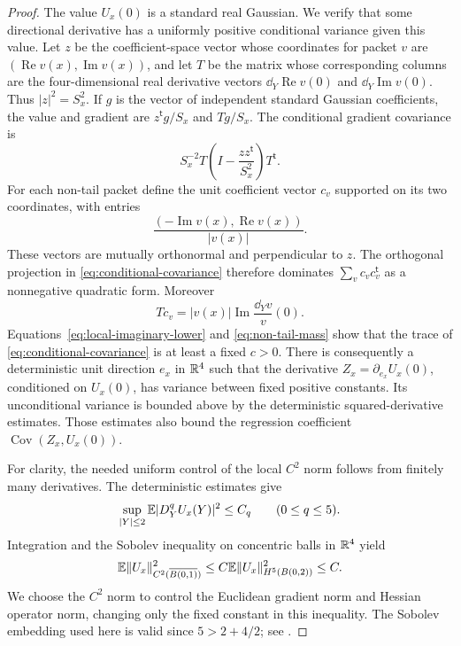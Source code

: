 \begin{proof}
The value $U_x(0)$ is a standard real Gaussian. We verify that some
directional derivative has a uniformly positive conditional
variance given this value. Let $z$ be the coefficient-space vector
whose coordinates for packet $v$ are
$(\operatorname{Re}v(x),\operatorname{Im}v(x))$, and let $T$ be the
matrix whose corresponding columns are the four-dimensional real
derivative vectors $\dd_Y\operatorname{Re}v(0)$ and
$\dd_Y\operatorname{Im}v(0)$. Thus $|z|^2=S_x^2$. If $g$ is the
vector of independent standard Gaussian coefficients, the value and
gradient are $z^{\mathsf t}g/S_x$ and $Tg/S_x$. The conditional
gradient covariance is
\begin{equation}\label{eq:conditional-covariance}
 S_x^{-2}T\left(I-\frac{zz^{\mathsf t}}{S_x^2}\right)T^{\mathsf t}.
\end{equation}
For each non-tail packet define the unit coefficient vector $c_v$
supported on its two coordinates, with entries
\[
 \frac{(-\operatorname{Im}v(x),\operatorname{Re}v(x))}{|v(x)|}.
\]
These vectors are mutually orthonormal and perpendicular to $z$.
The orthogonal projection in \eqref{eq:conditional-covariance}
therefore dominates $\sum_v c_vc_v^{\mathsf t}$ as a nonnegative
quadratic form. Moreover
\[
 Tc_v=|v(x)|\operatorname{Im}\frac{\dd_Yv}{v}(0).
\]
Equations~\eqref{eq:local-imaginary-lower} and
\eqref{eq:non-tail-mass} show that the trace of
\eqref{eq:conditional-covariance} is at least a fixed $c>0$.
There is consequently a deterministic unit direction $e_x$ in
$\mathbb R^4$ such that the derivative
$Z_x=\partial_{e_x}U_x(0)$, conditioned on $U_x(0)$, has variance
between fixed positive constants. Its unconditional variance is
bounded above by the deterministic squared-derivative estimates.
Those estimates also bound the regression coefficient
$\operatorname{Cov}(Z_x,U_x(0))$.

For clarity, the needed uniform control of the local $C^2$ norm
follows from finitely many derivatives. The deterministic estimates
give
\[
 \sup_{|Y|\le2}\mathbb E|D_Y^qU_x(Y)|^2\le C_q
 \qquad(0\le q\le5).
\]
Integration and the Sobolev inequality on concentric balls in
$\mathbb R^4$ yield
\begin{equation}\label{eq:local-c2-moment}
 \mathbb E\lVert U_x\rVert_{C^2(\overline{B(0,1)})}^2
 \le C\mathbb E\lVert U_x\rVert_{H^5(B(0,2))}^2\le C.
\end{equation}
We choose the $C^2$ norm to control the Euclidean gradient norm and
Hessian operator norm, changing only the fixed constant in this
inequality. The Sobolev embedding used here is valid since
$5>2+4/2$; see \cite[Sections~5.6--5.7]{Evans2010}.


\end{proof}
